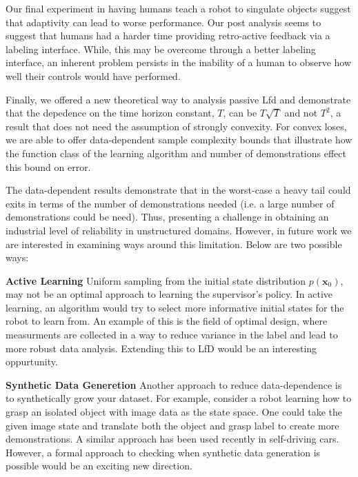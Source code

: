 \documentclass[10pt, conference]{ieeeconf}      %
\newcommand{\bx}{\mathbf{x}}
\begin{document}
Our final experiment in having humans teach a robot to singulate objects suggest that adaptivity can lead to worse performance. Our post analysis seems to suggest that humans had a harder time providing retro-active feedback via a labeling interface. While, this may be overcome through a better labeling interface, an inherent problem persists in the inability of a human to observe how well their controls would have performed. 

Finally, we offered a new theoretical  way to analysis passive Lfd and demonstrate that the depedence on the time horizon constant, $T$, can be $T\sqrt{T}$ and not $T^2$, a result that does not need the assumption of strongly convexity.  For convex loses, we are able to offer data-dependent sample complexity bounds that illustrate how the function class of the learning algorithm and number of demonstrations effect this bound on error. 

The data-dependent results demonstrate that in the worst-case a heavy tail could exits in terms of the number of demonstrations needed (i.e. a large number of demonstrations could be need). Thus, presenting a challenge in obtaining an industrial level of reliability in unstructured domains. However, in future work we are interested in examining ways around this limitation. Below are two possible ways:

\noindent \textbf{Active Learning} Uniform sampling from the initial state distribution $p(\bx_0)$, may not be an optimal approach to learning the supervisor's policy. In active learning, an algorithm would try to select more informative initial states for the robot to learn from. An example of this is the field of optimal design, where measurments are collected in a way to reduce variance in the label and lead to more robust data analysis. Extending this to LfD would be an interesting oppurtunity. 

\noindent \textbf{Synthetic Data Generetion} Another approach to reduce data-dependence is to synthetically grow your dataset. For example, consider a robot learning how to grasp an isolated object  with image data as the state space. One could take the given image state and translate both the object and grasp label to create more demonstrations. A similar approach has been used recently in self-driving cars. However, a formal approach to checking when synthetic data generation is possible would be an exciting new direction. 




\appendix

\end{document}
